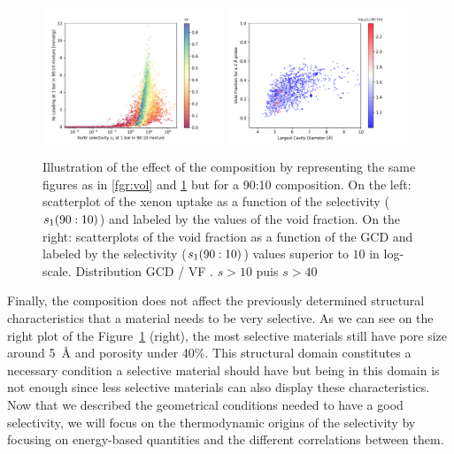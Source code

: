 \documentclass[main.tex]{subfiles}
\begin{document}
\begin{figure}[h!]
  \centering
  \includegraphics[width=0.48\textwidth]{figures/2-thermo/Scatterplot_uptake_selectivity_vol_9010.pdf}  
  \includegraphics[width=0.48\textwidth]{figures/2-thermo/Scatterplot_vf_gcd_selectivity9010.pdf}
  \caption{Illustration of the effect of the composition by representing the same figures as in \ref{fgr:vol} and \ref{fgr:compo} but for a 90:10 composition. On the left: scatterplot of the xenon uptake as a function of the selectivity ($s_{\text{1}}(90:10)$) and labeled by the values of the void fraction. On the right: scatterplots of the void fraction as a function of the GCD and labeled by the selectivity ($s_{\text{1}}(90:10)$) values superior to $10$ in log-scale.
  Distribution GCD / VF . $s>10$ puis $s>40$}\label{fgr:compo}
\end{figure}

Finally, the composition does not affect the previously determined structural characteristics that a material needs to be very selective. As we can see on the right plot of the Figure~\ref{fgr:compo} (right), the most selective materials still have pore size around \SI{5}{\angstrom} and porosity under {$40$\%}. This structural domain constitutes a necessary condition a selective material should have but being in this domain is not enough since less selective materials can also display these characteristics. Now that we described the geometrical conditions needed to have a good selectivity, we will focus on the thermodynamic origins of the selectivity by focusing on energy-based quantities and the different correlations between them.
\end{document}
